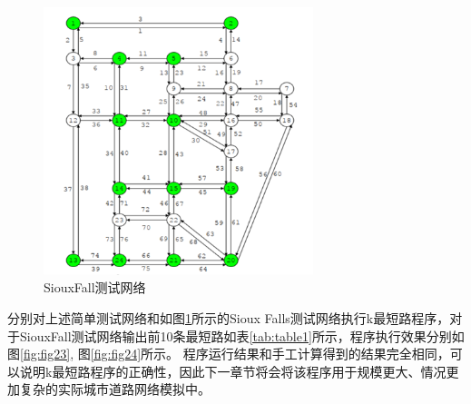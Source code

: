 \begin{figure}[H] %
    \centering %
    \includegraphics[width=0.7\textwidth]{png/图片22 SiouxFall测试网络} %
    \caption{SiouxFall测试网络} %
    \label{fig:fig22} %
\end{figure}
分别对上述简单测试网络和如图\ref{fig:fig22}所示的Sioux Falls测试网络执行k最短路程序，对于SiouxFall测试网络输出前10条最短路如表\ref{tab:table1}所示，程序执行效果分别如图\ref{fig:fig23}, 图\ref{fig:fig24}所示。
程序运行结果和手工计算得到的结果完全相同，可以说明k最短路程序的正确性，因此下一章节将会将该程序用于规模更大、情况更加复杂的实际城市道路网络模拟中。
